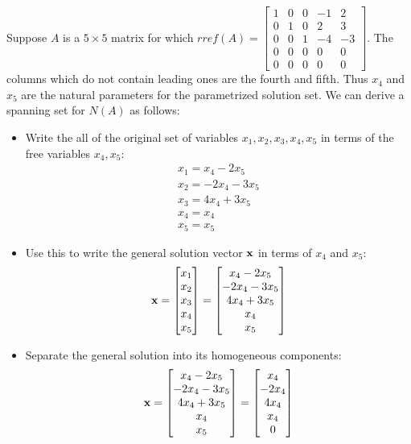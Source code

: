 \documentclass{ximera}
\begin{document}
\begin{example}
Suppose $A$ is a $5\times 5$ matrix for which $rref(A) = 
\begin{bmatrix} 1 & 0 & 0 & -1 & 2\\0 & 1 & 0 & 2 & 3\\0 & 0 & 1 & -4 & -3\\
0 & 0 & 0 & 0 & 0\\0 & 0 & 0 & 0 & 0\end{bmatrix}$. The columns which do not contain leading ones are the fourth and fifth. Thus $x_4$ and $x_5$ are the natural parameters for the parametrized solution set. We can derive a spanning set for $N(A)$ as follows:
\begin{itemize}
\item Write the all of the original set of variables $x_1, x_2, x_3, x_4, x_5$ in terms of the free variables $x_4, x_5$:
\begin{gather*}
x_1 = x_4 - 2x_5\\
x_2 = -2x_4 - 3x_5\\
x_3 = 4x_4 + 3x_5\\
x_4 = x_4\\
x_5 = x_5
\end{gather*}
\item Use this to write the general solution vector $\bf x$ in terms of $x_4$ and $x_5$:
\[
{\bf x} = \begin{bmatrix}x_1\\x_2\\x_3\\x_4\\x_5\end{bmatrix} =
\begin{bmatrix}x_4 - 2x_5\\-2x_4 -3x_5\\4x_4 + 3x_5\\x_4\\x_5\end{bmatrix}
\]
\item Separate the general solution into its homogeneous components:
\[
{\bf x} = \begin{bmatrix}x_4 - 2x_5\\-2x_4 -3x_5\\4x_4 + 3x_5\\x_4\\x_5\end{bmatrix}
= \begin{bmatrix}x_4\\-2x_4\\4x_4\\x_4\\0\end{bmatrix}
\]
\end{itemize}
\end{example}
\end{document}
